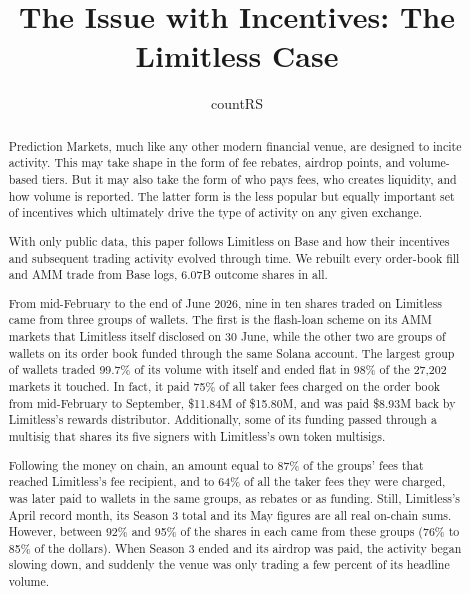 \documentclass[11pt]{article}
\title{The Issue with Incentives: The Limitless Case}
\author{countRS}
\date{}
\begin{document}
\maketitle


\begin{abstract}

Prediction Markets, much like any other modern financial venue, are designed to incite activity.
This may take shape in the form of fee rebates, airdrop points, and volume-based tiers.
But it may also take the form of who pays fees, who creates liquidity, and how volume is reported.
The latter form is the less popular but equally important set of incentives which ultimately drive the type of activity on any given exchange.

With only public data, this paper follows Limitless on Base and how their incentives and subsequent trading activity evolved through time.
We rebuilt every order-book fill and AMM trade from Base logs, 6.07B outcome shares in all.

From mid-February to the end of June 2026, nine in ten shares traded on Limitless came from three groups of wallets.
The first is the flash-loan scheme on its AMM markets that Limitless itself disclosed on 30 June, while the other two are groups of wallets on its order book funded through the same Solana account.
The largest group of wallets traded 99.7\% of its volume with itself and ended flat in 98\% of the 27,202 markets it touched.
In fact, it paid 75\% of all taker fees charged on the order book from mid-February to September, \$11.84M of \$15.80M, and was paid \$8.93M back by Limitless's rewards distributor.
Additionally, some of its funding passed through a multisig that shares its five signers with Limitless's own token multisigs.

Following the money on chain, an amount equal to 87\% of the groups' fees that reached Limitless's fee recipient, and to 64\% of all the taker fees they were charged, was later paid to wallets in the same groups, as rebates or as funding.
Still, Limitless's April record month, its Season 3 total and its May figures are all real on-chain sums.
However, between 92\% and 95\% of the shares in each came from these groups (76\% to 85\% of the dollars).
When Season 3 ended and its airdrop was paid, the activity began slowing down, and suddenly the venue was only trading a few percent of its headline volume.

\end{abstract}
\end{document}
